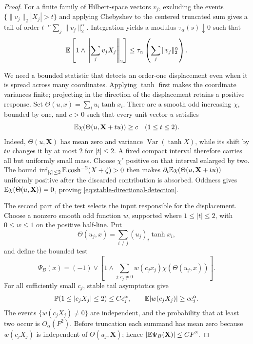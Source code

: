 \begin{proof}
For a finite family of Hilbert-space vectors \(v_j\), excluding the events
\(\{\|v_j\|_2|X_j|>t\}\) and applying Chebyshev to the centered truncated sum
gives a tail of order
\(t^{-\alpha}\sum_j\|v_j\|_2^\alpha\).  Integration yields a modulus
\(\tau_\alpha(s)\downarrow0\) such that
\begin{equation}
 \mathbb E\left[1\wedge\left\|\sum_jv_jX_j\right\|_2\right]
 \le\tau_\alpha\left(\sum_j\|v_j\|_2^\alpha\right).
 \label{eq:stable-hilbert-random-sum-truncation}
\end{equation}

We need a bounded statistic that detects an order-one displacement even
when it is spread across many coordinates. Applying \(\tanh\) first makes
the coordinate variances finite; projecting in the direction of the
displacement retains a positive response. Set \(\Theta(u,x)=\sum_i u_i\tanh x_i\).
There are a smooth odd increasing
\(\chi\), bounded by one, and \(c>0\) such that every unit
vector \(u\) satisfies
\begin{equation}
 \mathbb E\chi(\Theta(u,\mathbf X+tu))\ge c\quad(1\le t\le2).
 \label{eq:stable-directional-detection}
\end{equation}
Indeed, \(\Theta(u,\mathbf X)\) has mean zero and variance
\(\operatorname{Var}(\tanh X)\), while its shift by \(tu\) changes it by at
most \(2\) for \(|t|\le2\).  A fixed compact interval therefore carries all
but uniformly small mass.  Choose \(\chi'\) positive on that interval enlarged
by two.  The bound
\(\inf_{|\zeta|\le2}\mathbb E\cosh^{-2}(X+\zeta)>0\) then makes
\(\partial_t\mathbb E\chi(\Theta(u,\mathbf X+tu))\) uniformly positive after the discarded contribution is
absorbed.  Oddness gives \(\mathbb E\chi(\Theta(u,\mathbf X))=0\), proving
\eqref{eq:stable-directional-detection}.

The second part of the test selects the input responsible for the
displacement. Choose a nonzero smooth odd function \(w\), supported where
\(1\le|t|\le2\), with \(0\le w\le1\) on the positive half-line.
Put
\[
 \Theta(u_j,x)=\sum_{i\ne j}(u_j)_i\tanh x_i,
\]
and define the bounded test
\[
 \Psi_B(x)=(-1)\vee\left[1\wedge
 \sum_{j:c_j\ne0}w(c_jx_j)\chi(\Theta(u_j,x))\right].
\]
For all sufficiently small \(c_j\), stable tail asymptotics give
\begin{equation}
 \mathbb P(1\le|c_jX_j|\le2)\le C c_j^\alpha,
 \qquad
 \mathbb E|w(c_jX_j)|\ge c c_j^\alpha.
 \label{eq:stable-support-event-probability}
\end{equation}
The events \(\{w(c_jX_j)\ne0\}\) are independent, and the probability that at
least two occur is \(O_\alpha(F^2)\).  Before truncation each summand
has mean zero because \(w(c_jX_j)\) is independent of \(\Theta(u_j,\mathbf X)\);
hence
\(|\mathbb E\Psi_B(\mathbf X)|\le C F^2\).


\end{proof}
